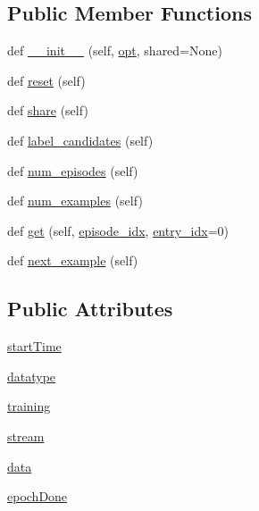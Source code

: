 \subsection*{Public Member Functions}
\begin{DoxyCompactItemize}
\item 
def \hyperlink{classparlai_1_1core_1_1teachers_1_1DialogTeacher_a9385b9ae914ef84be6b54107811b202b}{\+\_\+\+\_\+init\+\_\+\+\_\+} (self, \hyperlink{classparlai_1_1core_1_1agents_1_1Teacher_a3ce6243860ce978a897922863ed32fa4}{opt}, shared=None)
\item 
def \hyperlink{classparlai_1_1core_1_1teachers_1_1DialogTeacher_a393f94ea28e1733f575a9f36a0b43c18}{reset} (self)
\item 
def \hyperlink{classparlai_1_1core_1_1teachers_1_1DialogTeacher_a55fc9dead757489e127ec1a872849376}{share} (self)
\item 
def \hyperlink{classparlai_1_1core_1_1teachers_1_1DialogTeacher_a50649105cc9d00bcaa860290d804eac9}{label\+\_\+candidates} (self)
\item 
def \hyperlink{classparlai_1_1core_1_1teachers_1_1DialogTeacher_af1e90a07058dc489c45280f0982e21be}{num\+\_\+episodes} (self)
\item 
def \hyperlink{classparlai_1_1core_1_1teachers_1_1DialogTeacher_ad90c8cac27f2db22db77e29828b94dfe}{num\+\_\+examples} (self)
\item 
def \hyperlink{classparlai_1_1core_1_1teachers_1_1DialogTeacher_a1988d984bf87370e9a9e58c9b8ca67a8}{get} (self, \hyperlink{classparlai_1_1core_1_1teachers_1_1FixedDialogTeacher_afd4ebab8063eb42d182d30a1a41f133e}{episode\+\_\+idx}, \hyperlink{classparlai_1_1core_1_1teachers_1_1FixedDialogTeacher_ae3201b15f3c3b46a2f3511bad9b43e7d}{entry\+\_\+idx}=0)
\item 
def \hyperlink{classparlai_1_1core_1_1teachers_1_1DialogTeacher_a738c4571db2fee7ce3ab01072f10ed49}{next\+\_\+example} (self)
\end{DoxyCompactItemize}
\subsection*{Public Attributes}
\begin{DoxyCompactItemize}
\item 
\hyperlink{classparlai_1_1core_1_1teachers_1_1DialogTeacher_a8dc7153ce190442ad5d35b255389bf5a}{start\+Time}
\item 
\hyperlink{classparlai_1_1core_1_1teachers_1_1DialogTeacher_a4bd247f78e23331700e150991d0afdba}{datatype}
\item 
\hyperlink{classparlai_1_1core_1_1teachers_1_1DialogTeacher_aaca26d863c30e54b4612539843f20b49}{training}
\item 
\hyperlink{classparlai_1_1core_1_1teachers_1_1DialogTeacher_a82fa5b519a14c4301ce82f6c59c8867a}{stream}
\item 
\hyperlink{classparlai_1_1core_1_1teachers_1_1DialogTeacher_a6089018ef23e5f55862292d25628e6a5}{data}
\item 
\hyperlink{classparlai_1_1core_1_1teachers_1_1DialogTeacher_a9e2cd457217253ef6d3aa0b23418739b}{epoch\+Done}
\end{DoxyCompactItemize}


